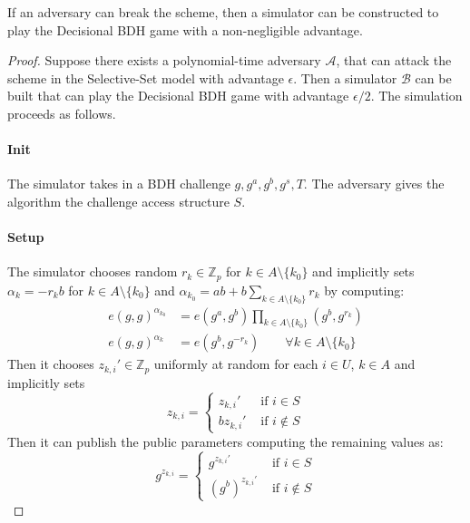   \begin{theorem}
    If an adversary can break the scheme, then a simulator can be constructed to play the Decisional BDH game with a non-negligible advantage.
  \end{theorem}

  \begin{proof}
    Suppose there exists a polynomial-time adversary $\mathcal{A}$, that can attack the scheme in the Selective-Set model with advantage $\epsilon$.
    Then a simulator $\mathcal{B}$ can be built that can play the Decisional BDH game with advantage $\epsilon/2$.
    The simulation proceeds as follows.

    \paragraph*{Init}
      The simulator takes in a BDH challenge $g, g^a, g^b, g^s, T$.
      The adversary gives the algorithm the challenge access structure $S$.

    \paragraph*{Setup}
      The simulator chooses random $r_k \in \mathbb{Z}_p$ for $k \in A \setminus \{k_0\}$ and implicitly sets $\alpha_k = -r_k b$ for $k \in A \setminus \{k_0\}$ and $\alpha_{k_0} = a b + b \sum_{k \in A \setminus \{k_0\}} r_k$ by computing:
      \begin{align*}
        e(g,g)^{\alpha_{k_0}} &= e(g^a, g^b) \prod_{k \in A \setminus \{k_0\}} (g^b, g^{r_k}) \\
e(g,g)^{\alpha_k} &= e(g^b, g^{-r_k}) \qquad \forall k \in A \setminus \{k_0\}
      \end{align*}
      Then it chooses $z_{k, i}' \in \mathbb{Z}_p$ uniformly at random for each $i \in U$, $k \in A$ and implicitly sets
      $$
        z_{k, i} =
        \begin{cases}
          z_{k, i}' &\text{ if } i \in S \\
          b z_{k, i}' &\text{ if } i \notin S
        \end{cases}
      $$
      Then it can publish the public parameters computing the remaining values as:
      $$
        g^{z_{k, i}} =
        \begin{cases}
          g^{z_{k, i}'} &\text{ if } i \in S \\
          (g^b)^{z_{k, i}'} &\text{ if } i \notin S
        \end{cases}
      $$


\end{proof}
